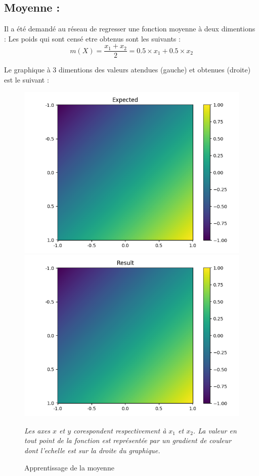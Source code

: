 
\subsection{Moyenne :}\label{subsec:moy}
Il a été demandé au réseau de regresser une fonction moyenne à deux dimentions :
Les poids qui sont censé etre obtenus sont les suivants :
\begin{equation}
    \label{eq:moy}
    m(X) =\frac{x_1 + x_2}{2} = 0.5 \times x_1 + 0.5 \times x_2
\end{equation}

Le graphique à 3 dimentions des valeurs atendues (gauche) et obtenues (droite) est le suivant :
\begin{figure}[H]
    \center
    \includegraphics[height=\petit]{pict/moy/expected}
    \includegraphics[height=\petit]{pict/moy/result}
	\caption{Apprentissage de la moyenne}
    \vspace{-10pt}
    \begin{center}
        \tiny
        \textit{
        Les axes $x$ et $y$ corespondent respectivement à $x_1$ et $x_2$.
        La valeur en tout point de la fonction est représentée par un gradient de couleur
        dont l'echelle est sur la droite du graphique.
        }
    \end{center}
	\label{fig:moy}
\end{figure}
\vspace{-12pt}

